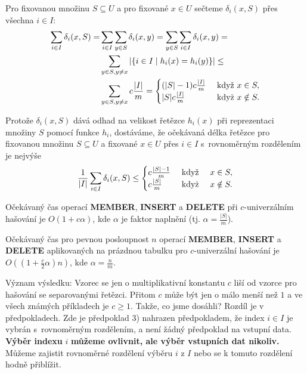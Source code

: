 \documentclass[a4paper,12pt]{article}
\begin{document}
Pro fixovanou množinu $S\subseteq U$ a pro fixované $
x\in U$ sečteme
$\delta_i(x,S)$ přes všechna $i\in I$:
\begin{align*}\sum_{i\in I}\delta_i(x,S)=&\sum_{i\in I}\sum_{y\in S}\delta_
i(x,y)=\sum_{y\in S}\sum_{i\in I}\delta_i(x,y)=\\
&\sum_{y\in S,y\ne x}|\{i\in I\mid h_i(x)=h_i(y)\}|\le\\
&\sum_{y\in S,y\ne x}c\frac {|I|}m=\begin{cases} (|S|-1)c\frac {|I|}m&\text{\rm\ když }
x\in S,\\
|S|c\frac {|I|}m&\text{\rm\ když }x\notin S.\end{cases} \end{align*}

Protože $\delta_i(x,S)$ dává odhad na velikost řetězce $
h_i(x)$ při 
repre\-zentaci množiny $S$ pomocí funkce $h_i$, dostáváme, že 
očekávaná délka řetězce pro fixovanou množinu  
$S\subseteq U$ a fixované $x\in U$ přes $i\in I$ s~rovnoměrným 
rozdělením je nejvýše
$$\frac 1{|I|}\sum_{i\in I}\delta_i(x,S)\le\begin{cases} c\frac {|S|-1}m&\text{\rm\ když }
\quad x\in S,\\
c\frac {|S|}m&\text{\rm\ když }\quad x\notin S.\end{cases} $$

\begin{veta}Očekávaný čas operací {\bf MEMBER}, {\bf INSERT }
a {\bf DE\-LETE} při $c$-univerzálním hašování je $
O(1+c\alpha )$, kde 
$\alpha$ je faktor napl\-nění (tj. $\alpha =\frac {|S|}m$).

Očekávaný čas pro pevnou posloupnost $n$ operací 
{\bf MEMBER}, {\bf INSERT} a {\bf DELETE} aplikovaných na prázdnou ta\-bulku 
pro $c$-univerzální hašování je $O((1+\frac c2\alpha 
)n)$, kde $\alpha =\frac nm$.  
\end{veta}

Význam výsledku:  Vzorec se jen o multiplikativní 
konstantu $c$ liší od vzorce pro hašování se separovanými 
řetězci.  Přitom $c$ může být jen o málo menší než $
1$ a 
ve všech známých příkla\-dech je $c\ge 1$.  Takže, co jsme 
dosáhli?  Rozdíl je v předpokla\-dech.  Zde je předpoklad 3) 
nahrazen předpokladem, že index $i\in I$ je vybrán s~rovnoměrným rozdělením, a není žádný předpoklad na vstupní 
data.  {\bf Výběr indexu} $i$ {\bf můžeme ov\-liv\-nit, ale výběr 
vstupních dat nikoliv.}  Můžeme zajistit rovno\-měr\-né 
rozdělení výběru $i$ z $I$ nebo se k tomuto rozdělení hodně 
přiblížit.  
\end{document}
